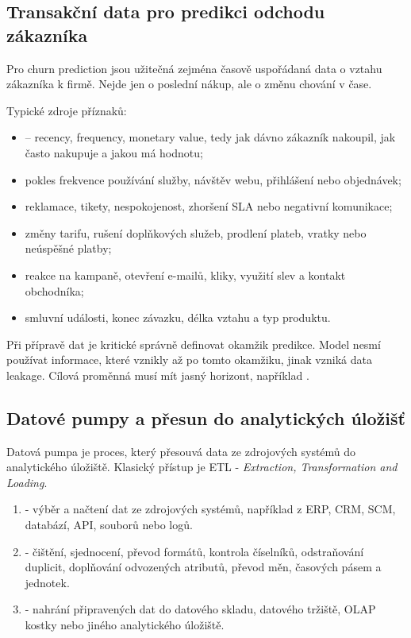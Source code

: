 \subsection{Transakční data pro predikci odchodu zákazníka}
Pro churn prediction jsou užitečná zejména časově uspořádaná data o vztahu zákazníka k firmě. Nejde jen
o poslední nákup, ale o změnu chování v čase.

Typické zdroje příznaků:
\begin{itemize}
  \item {} -- recency, frequency, monetary value, tedy jak dávno zákazník nakoupil,
  jak často nakupuje a jakou má hodnotu;
  \item pokles frekvence používání služby, návštěv webu, přihlášení nebo objednávek;
  \item reklamace, tikety, nespokojenost, zhoršení SLA nebo negativní komunikace;
  \item změny tarifu, rušení doplňkových služeb, prodlení plateb, vratky nebo neúspěšné platby;
  \item reakce na kampaně, otevření e-mailů, kliky, využití slev a kontakt obchodníka;
  \item smluvní události, konec závazku, délka vztahu a typ produktu.
\end{itemize}

Při přípravě dat je kritické správně definovat okamžik predikce. Model nesmí používat informace, které
vznikly až po tomto okamžiku, jinak vzniká data leakage. Cílová proměnná musí mít jasný horizont, například
.

\subsection{Datové pumpy a přesun do analytických úložišť}
Datová pumpa je proces, který přesouvá data ze zdrojových systémů do analytického úložiště. Klasický
přístup je ETL - \textit{Extraction, Transformation and Loading}.

\begin{enumerate}
  \item {} - výběr a načtení dat ze zdrojových systémů, například z ERP, CRM, SCM,
  databází, API, souborů nebo logů.
  \item {} - čištění, sjednocení, převod formátů, kontrola číselníků, odstraňování
  duplicit, doplňování odvozených atributů, převod měn, časových pásem a jednotek.
  \item {} - nahrání připravených dat do datového skladu, datového tržiště, OLAP kostky
  nebo jiného analytického úložiště.
\end{enumerate}

